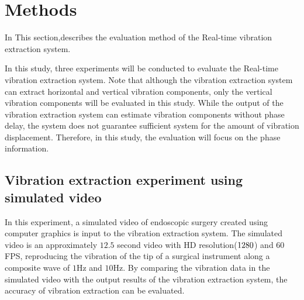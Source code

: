 \section{Methods}\label{section:methods}

In This section,describes the evaluation method of the Real-time vibration extraction system.

In this study, three experiments will be conducted to evaluate the Real-time vibration extraction system.
Note that although the vibration extraction system can extract horizontal and vertical vibration components,
only the vertical vibration components will be evaluated in this study.
While the output of the vibration extraction system can estimate vibration components without phase delay,
the system does not guarantee sufficient system for the amount of vibration displacement. Therefore, in this study, the evaluation will focus on the phase information.

\subsection{Vibration extraction experiment using simulated video}\label{subsection:experiment1}

In this experiment, a simulated video of endoscopic surgery created using computer graphics is input to the vibration extraction system.
The simulated video is an approximately $12.5$ second video
with HD resolution($1280 \time 780$) and $60$FPS,
reproducing the vibration of the tip of a surgical
instrument along a composite wave of $1$Hz and $10$Hz.
By comparing the vibration data in the simulated video
with the output results of the vibration extraction system,
the accuracy of vibration extraction can be evaluated.

